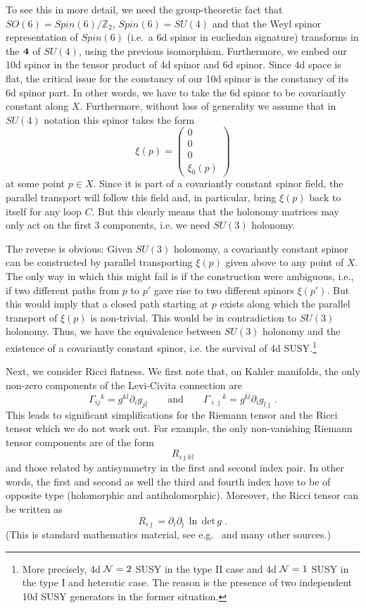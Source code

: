 \documentclass[12pt]{article}
\newcommand{\be}{\begin{equation}}
\newcommand{\ee}{\end{equation}}
\newcommand{\ol}{\overline}
\numberwithin{equation}{section}
\begin{document}
To see this in more detail, we need the group-theoretic fact that $SO(6)=Spin(6)/\mathbb{Z}_2$, $Spin(6)=SU(4)$ and that the Weyl spinor representation of $Spin(6)$ (i.e.~a 6d spinor in eucliedan signature) transforms in the $\bf{4}$ of $SU(4)$, using the previous isomorphism. Furthermore, we embed our 10d spinor in the tensor product of 4d spinor and 6d spinor. Since 4d space is flat, the critical issue for the constancy of our 10d spinor is the constancy of its 6d spinor part. In other words, we have to take the 6d spinor to be covariantly constant along $X$. Furthermore, without loss of generality we assume that in $SU(4)$ notation this spinor takes the form 
\be
\xi(p)=\left(\begin{array}{c}0\\0\\0\\ \xi_0(p)\end{array}\right)
\ee
at some point $p\in X$. Since it is part of a covariantly constant spinor field, the parallel transport will follow this field and, in particular, bring $\xi(p)$ back to itself for any loop $C$. But this clearly means that the holonomy matrices may only act on the first 3 components, i.e. we need $SU(3)$ holonomy. 

The reverse is obvious: Given $SU(3)$ holomomy, a covariantly constant spinor can be constructed by parallel transporting $\xi(p)$ given above to any point of $X$. The only way in which this might fail is if the construction were ambiguous, i.e., if two different paths from $p$ to $p'$ gave rise to two different spinors $\xi(p')$. But this would imply that a closed path starting at $p$ exists along which the parallel transport of $\xi(p)$ is non-trivial. This would be in contradiction to $SU(3)$ holonomy. Thus, we have the equivalence between $SU(3)$ holonomy and the existence of a covariantly constant spinor, i.e. the survival of 4d SUSY.\footnote{
More
precisely, 4d ${\cal N}=2$ SUSY in the type II case and  4d ${\cal N}=1$ SUSY in the type I and heterotic case. The reason is the presence of two independent 10d SUSY generators in the former situation.
}

Next, we consider Ricci flatness. We first note that, on Kahler manifolds, the only non-zero components of the Levi-Civita connection are
\be
\Gamma_{ij}{}^k = g^{k\ol{l}}\partial_i g_{j\ol{l}}\qquad \mbox{and}\qquad 
\Gamma_{\ol{\imath}\ol{\jmath}}{}^{\ol{k}} = g^{\ol{k}l}\partial_{\ol{\imath}}
g_{l\ol{\jmath}}\,.
\ee
This leads to significant simplifications for the Riemann tensor and the Ricci tensor which we do not work out. For example, the only non-vanishing Riemann tensor components are of the form
\be
R_{i\ol{\jmath}k\ol{l}}
\ee
and those related by antisymmetry in the first and second index pair. In other words, the first and second as well the third and fourth index have to be of opposite type (holomorphic and antiholomorphic). Moreover, the Ricci tensor can be written as
\be
R_{i\ol{\jmath}}=\partial_i\partial_{\ol{\jmath}}\,\ln\,\mbox{det}\,g\,\,.
\ee
(This is standard mathematics material, see e.g.~\cite{Viaclovsky} and many other sources.)
\end{document}
